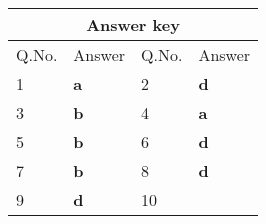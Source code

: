 \setlength\arrayrulewidth{1pt}
\begin{table}[H]
	\centering
	\begin{tabular}{|p{1.5cm}|p{1.5cm}||p{1.5cm}|p{1.5cm}|}
		\hline
		\multicolumn{4}{|c|}{\textbf{Answer key}}\\\hline\hline
		\rowcolor{ocrel}Q.No.&Answer&Q.No.&Answer\\\hline
		1&\textbf{a} &2&\textbf{d}\\\hline 
		3&\textbf{b} &4&\textbf{a} \\\hline
		5&\textbf{b} &6&\textbf{d} \\\hline
		7&\textbf{b}&8&\textbf{d}\\\hline
		9&\textbf{d}&10&\textbf{}\\\hline
		
		
	\end{tabular}
\end{table}

